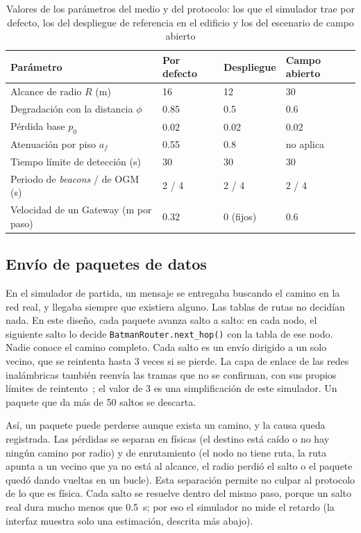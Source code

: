 \begin{table}[htbp!]
    \centering
    \caption{Valores de los parámetros del medio y del protocolo: los que el simulador trae por defecto, los del despliegue de referencia en el edificio y los del escenario de campo abierto}
    \label{tab:parametros}
    \footnotesize
    \begin{tabular}{|p{6.4cm}|p{1.8cm}|p{1.8cm}|p{2.2cm}|}
        \hline
        \textbf{Parámetro} & \textbf{Por defecto} & \textbf{Despliegue} & \textbf{Campo abierto} \\
        \hline
        Alcance de radio $R$ (m) & 16 & 12 & 30 \\
        \hline
        Degradación con la distancia $\phi$ & 0.85 & 0.5 & 0.6 \\
        \hline
        Pérdida base $p_0$ & 0.02 & 0.02 & 0.02 \\
        \hline
        Atenuación por piso $a_f$ & 0.55 & 0.8 & no aplica \\
        \hline
        Tiempo límite de detección (s) & 30 & 30 & 30 \\
        \hline
        Periodo de \textit{beacons} / de OGM (s) & 2 / 4 & 2 / 4 & 2 / 4 \\
        \hline
        Velocidad de un Gateway (m por paso) & 0.32 & 0 (fijos) & 0.6 \\
        \hline
    \end{tabular}
\end{table}

\subsection{Envío de paquetes de datos}
\label{sec:plano-datos}

En el simulador de partida, un mensaje se entregaba buscando el camino en la
red real, y llegaba siempre que existiera alguno. Las tablas de rutas no
decidían nada. En este diseño, cada paquete avanza salto a salto: en cada nodo,
el siguiente salto lo decide \texttt{BatmanRouter.next\_hop()} con la tabla de
ese nodo. Nadie conoce el camino completo. Cada salto es un envío dirigido a un
solo vecino, que se reintenta hasta 3 veces si se pierde. La capa de enlace de
las redes inalámbricas también reenvía las tramas que no se confirman, con sus
propios límites de reintento~\cite{IEEE80211}; el valor de 3 es una
simplificación de este simulador. Un paquete que da más de 50
saltos se descarta.

Así, un paquete puede perderse aunque exista un camino, y la causa queda
registrada. Las pérdidas se separan en físicas (el destino está caído o no hay
ningún camino por radio) y de enrutamiento (el nodo no tiene ruta, la ruta
apunta a un vecino que ya no está al alcance, el radio perdió el salto o el
paquete quedó dando vueltas en un bucle). Esta separación permite no culpar al
protocolo de lo que es física. Cada salto se resuelve dentro del mismo paso,
porque un salto real dura mucho menos que 0.5~s; por eso el simulador no mide el
retardo (la interfaz muestra solo una estimación, descrita más abajo).

